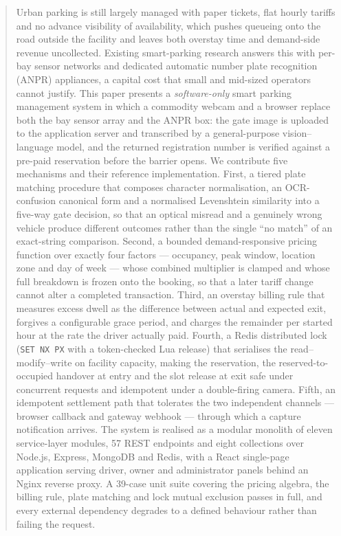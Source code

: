 \documentclass[journal,onecolumn,11pt]{IEEEtran}
\begin{document}
\begin{abstract}
Urban parking is still largely managed with paper tickets, flat hourly tariffs
and no advance visibility of availability, which pushes queueing onto the road
outside the facility and leaves both overstay time and demand-side revenue
uncollected. Existing smart-parking research answers this with per-bay sensor
networks and dedicated automatic number plate recognition (ANPR) appliances, a
capital cost that small and mid-sized operators cannot justify. This paper
presents a \emph{software-only} smart parking management system in which a
commodity webcam and a browser replace both the bay sensor array and the ANPR
box: the gate image is uploaded to the application server and transcribed by a
general-purpose vision--language model, and the returned registration number is
verified against a pre-paid reservation before the barrier opens. We contribute
five mechanisms and their reference implementation. First, a tiered plate
matching procedure that composes character normalisation, an OCR-confusion
canonical form and a normalised Levenshtein similarity into a five-way gate
decision, so that an optical misread and a genuinely wrong vehicle produce
different outcomes rather than the single ``no match'' of an exact-string
comparison. Second, a bounded demand-responsive pricing function over exactly
four factors --- occupancy, peak window, location zone and day of week ---
whose combined multiplier is clamped and whose full breakdown is frozen onto
the booking, so that a later tariff change cannot alter a completed
transaction. Third, an overstay billing rule that measures excess dwell as the
difference between actual and expected exit, forgives a configurable grace
period, and charges the remainder per started hour at the rate the driver
actually paid. Fourth, a Redis distributed lock (\texttt{SET NX PX} with a
token-checked Lua release) that serialises the read--modify--write on facility
capacity, making the reservation, the reserved-to-occupied handover at entry
and the slot release at exit safe under concurrent requests and idempotent
under a double-firing camera. Fifth, an idempotent settlement path that
tolerates the two independent channels --- browser callback and gateway webhook
--- through which a capture notification arrives. The system is realised as a
modular monolith of eleven service-layer modules, 57 REST endpoints and eight
collections over Node.js, Express, MongoDB and Redis, with a React single-page
application serving driver, owner and administrator panels behind an Nginx
reverse proxy. A 39-case unit suite covering the pricing algebra, the billing
rule, plate matching and lock mutual exclusion passes in full, and every
external dependency degrades to a defined behaviour rather than failing the
request.
\end{abstract}
\end{document}
